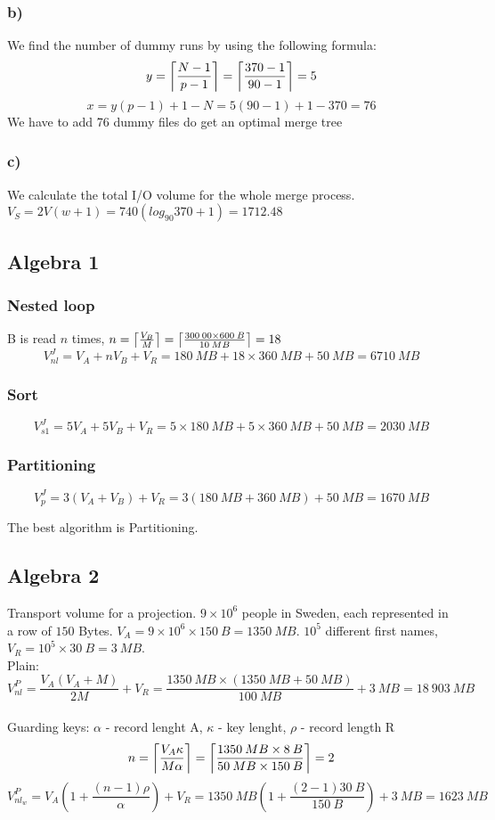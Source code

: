 \documentclass{article}
\DeclarePairedDelimiter{\ceil}{\lceil}{\rceil}
\begin{document}
\subsubsection*{b)}
We find the number of dummy runs by using the following formula:
\[
    y = \ceil*{\frac{N-1}{p-1}} = \ceil*{\frac{370-1}{90-1}} = 5
\]
\[
    x = y(p - 1) + 1 - N = 5(90-1) + 1 - 370 = 76
\]
We have to add 76 dummy files do get an optimal merge tree

\subsubsection*{c)}
We calculate the total I/O volume for the whole merge process.
\( V_S = 2V(w+1) = 740(log_{90}370 + 1) = 1712.48 \)


\subsection*{Algebra 1}
\subsubsection*{Nested loop}
B is read $n$ times, \( n = \ceil*{\frac{V_B}{M}} = \ceil*{\frac{300\:00 \times 600\:B}{10\:MB}} = 18 \)
\[
    V_{nl}^J = V_A + nV_B + V_R = 180\:MB + 18\times360\:MB + 50\:MB = 6710\:MB
\]
\subsubsection*{Sort}
\[
    V_{s1}^J = 5V_A + 5V_B + V_R = 5 \times 180\:MB + 5\times 360\:MB + 50\:MB = 2030\:MB
\]

\subsubsection*{Partitioning}
\[
    V_p^J = 3(V_A + V_B) +V_R = 3(180\:MB + 360\:MB) + 50\:MB = 1670\:MB
\]

The best algorithm is Partitioning.


\subsection*{Algebra 2}
Transport volume for a projection. $9\times10^6$ people in Sweden, each represented in a row of $150$ Bytes.
$V_A = 9\times10^6 \times 150\:B = 1350\:MB$. $10^5$ different first names, $V_R = 10^5 \times 30\:B = 3\:MB$.
\\
Plain:
\[
    V_{nl}^P = \frac{V_A(V_A+M)}{2M}+V_R = 
    \frac{1350\:MB \times (1350\:MB + 50\:MB)}{100\:MB}+3\:MB = 18\:903\:MB
\]
\\
Guarding keys:
$\alpha$ - record lenght A, $\kappa$ - key lenght, $\rho$ - record length R
\[
    n = \ceil*{\frac{V_A\kappa}{M\alpha}} = \ceil*{\frac{1350\:MB \times 8\:B}{50\:MB \times 150\:B}} = 2
\]
\[
    V_{nl_w}^P = V_A\left(1+\frac{(n-1)\rho}{\alpha}\right) + V_R = 
    1350\:MB\left(1+\frac{(2-1)30\:B}{150\:B}\right)+3\:MB = 1623\:MB
\]
\end{document}
